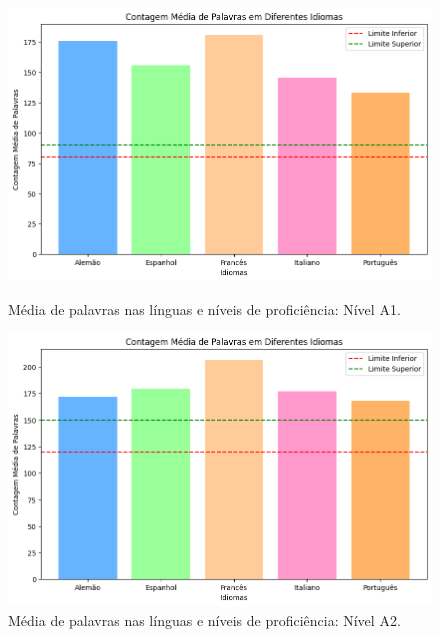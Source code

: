 \documentclass[portuguese]{textolivre}
\begin{document}
\begin{figure}[p]
 \centering
 \begin{minipage}{.47\textwidth}
 \includegraphics[width=\textwidth]{Fig1.png}
 \caption{Média de palavras nas línguas e níveis de proficiência: Nível A1.}
 \label{fig1}
 \end{minipage}%
 \qquad
 \begin{minipage}{0.47\textwidth}
 \includegraphics[width=\textwidth]{Fig2.png}
 \caption{Média de palavras nas línguas e níveis de proficiência: Nível A2.}
 \label{fig2}
 \end{minipage}%
\end{figure}
\end{document}
